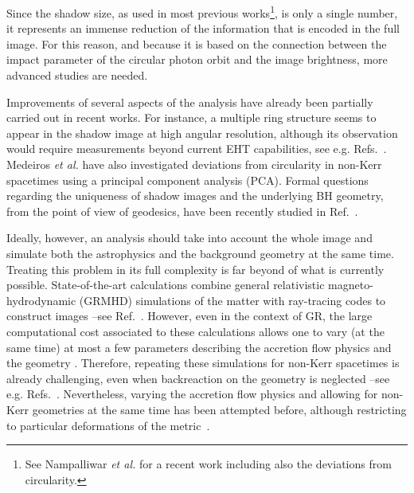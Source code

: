 \documentclass[%
nofootinbib,
 amsmath,amssymb,
 aps,
floatfix,
twocolumn
]{revtex4-2}
\begin{document}
Since the shadow size, as used in most previous works\footnote{See Nampalliwar \textit{et al.} \cite{Nampalliwar:2021oqr} for a recent work including also the deviations from circularity.}, is only a single number, it represents an immense reduction of the information that is encoded in the full image. For this reason, and because it is based on the connection between the impact parameter 
of the circular photon orbit and the image
brightness, more advanced studies are needed.

Improvements of several aspects of the analysis have already  been partially carried out in recent works. For instance, a multiple ring structure 
seems to appear in the shadow image at high angular resolution, although its observation would require
 measurements beyond current EHT capabilities, see e.g. Refs.~\cite{PhysRevD.102.124004,Broderick:2021ohx, MaciekWielgus:2021peu}. Medeiros \textit{et al.} \cite{Medeiros:2019cde} have also investigated deviations from circularity in non-Kerr spacetimes using a principal component analysis (PCA). Formal questions regarding the uniqueness of shadow images and the underlying BH geometry, from the point of view of geodesics, have been recently studied in Ref.~\cite{Lima:2021las}.

Ideally, however,  an analysis should take into account the whole image and simulate both the astrophysics and the background geometry at the same time. Treating this problem in its full complexity is far beyond of what is currently possible. State-of-the-art calculations combine general relativistic magneto-hydrodynamic (GRMHD) simulations of the matter with ray-tracing codes to construct images --see Ref.~\cite{Akiyama:2019eap, Akiyama:2019fyp}. 
%
However, even in the context of GR, the large computational cost associated to these calculations allows one to vary (at the same time) at most a few parameters describing the accretion flow physics and the geometry \cite{Akiyama:2019fyp, Vincent:2020dij}. 
%
Therefore, repeating these simulations for non-Kerr spacetimes is already challenging, even when backreaction on the geometry is neglected --see e.g. Refs.~\cite{Mizuno:2018lxz, Olivares:2020wpo}.
%
Nevertheless, varying the accretion flow physics and allowing for non-Kerr geometries at the same time has been attempted before, although restricting to particular deformations of the metric~\cite{Broderick_2014}.
\end{document}

